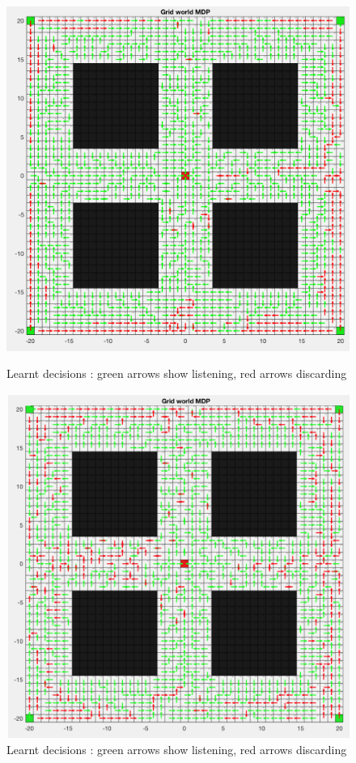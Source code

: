 \documentclass[a4paper]{report}
\begin{document}
{{{{				
				\begin{figure}[h!]
					\begin{minipage}{0.5\linewidth}
						\begin{center}
							\includegraphics[width=0.95\linewidth]{heatmap_decision_120}
							\caption{Learnt decisions : green arrows show listening, red arrows discarding}
							\label{fig::heatmap_des_120}
						\end{center}
					\end{minipage}
					\begin{minipage}{0.5\linewidth}
						\begin{center}
							\includegraphics[width=0.95\linewidth]{heatmap_decision_50}
							\caption{Learnt decisions : green arrows show listening, red arrows discarding}
							\label{fig::heatmap_des_50}
						\end{center}
					\end{minipage}
				\end{figure}
			
}}}}
\end{document}
